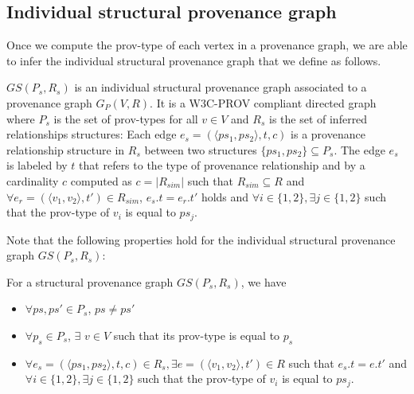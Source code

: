 \subsection{Individual structural provenance graph}
Once we compute the prov-type of each vertex in a provenance graph, we are able to infer the individual structural provenance graph that we define as follows.
\begin{definition}
  \label{def:temp-prov}
$GS(P_s, R_s)$ is an individual structural provenance graph associated to a provenance graph $G_P(V, R)$.
It is a W3C-PROV compliant directed graph where $P_s$ is the set of prov-types for all $v \in V$ and $R_s$ is the set of inferred relationships structures: 
Each edge $e_s = (\langle ps_1, ps_2\rangle,t,c)$ is a provenance relationship structure in $R_s$ between two structures $\{ps_1, ps_2\} \subseteq P_s$. The edge $e_s$ is labeled by $t$ that refers to the type of provenance relationship and  by a cardinality $c$ computed as  $c=|R_{sim}|$ such that  $R_{sim}\subseteq R$ and  $\forall  e_r=(\langle v_1, v_2\rangle,t') \in R_{sim}$, $e_s.t=e_r.t'$ holds and  $\forall i  \in \{1,2\},  \exists j  \in \{1,2\}$ such that the prov-type of $v_{i}$ is equal to $ps_j$. 
\end{definition}


Note that the following properties hold for the individual structural provenance graph $GS(P_s, R_s)$:

\begin{lemma}
\label{def:prop}
For a structural provenance graph $GS(P_s, R_s)$, we have
\begin{itemize}
\item  $\forall ps ,ps'  \in P_s$,   $ps \neq ps'$
\item  $\forall p_s  \in P_s  $, $  \exists$  $v \in V$  such that its prov-type is equal to $p_s$
\item  $\forall e_s=(\langle ps_1, ps_2\rangle,t,c) \in R_s, \exists e=(\langle v_1, v_2\rangle,t') \in R$  such that $e_s.t=e.t'$ and $ \forall i  \in \{1,2\}, \exists j  \in \{1,2\} $ such that the prov-type of $v_{i}$ is equal to $ps_j$.
\end{itemize}
\end{lemma}

